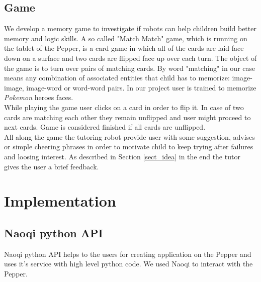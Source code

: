 \documentclass[12pt]{article}
\begin{document}
\subsection{Game}
\label{sect_game_descr}
We develop a memory game to investigate if robots can help children build better memory and logic skills. A so called "Match Match" game, which is running on the tablet of the Pepper, is a card game in which all of the cards are laid face down on a surface and two cards are flipped face up over each turn. The object of the game is to turn over pairs of matching cards. By word "matching" in our case means any combination of associated entities that child has to memorize: image-image, image-word or word-word pairs. In our project user is trained to memorize \textit{Pokemon} heroes faces.
\\
While playing the game user clicks on a card in order to flip it. In case of two cards are matching each other they remain unflipped and user might proceed to next cards. Game is considered finished if all cards are unflipped.
\\
All along the game the tutoring robot provide user with some suggestion,  advises or simple cheering phrases in order to motivate child to keep trying after failures and loosing interest. As described in Section \ref{sect_idea} in the end the tutor gives the user a brief feedback.
\newpage
\section{Implementation}
\subsection{Naoqi python API}
Naoqi python API helps to the users for creating application on the Pepper and uses it's service with high level python code. We used Naoqi to interact with the Pepper.
\end{document}
